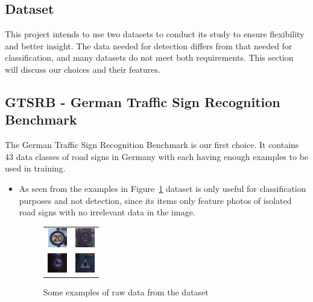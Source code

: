 \documentclass[12pt, landscape, margin=2cm]{article}
\begin{document}
\begin{multicols}{3}
\lipsum[3]

\section{Dataset}
This project intends to use two datasets to conduct its study to ensure
flexibility and better insight. The data needed for detection differs from that
needed for classification, and many datasets do not meet both requirements. This
section will discuss our choices and their features.
\subsection{GTSRB - German Traffic Sign Recognition Benchmark}
The German Traffic Sign Recognition Benchmark is our first choice. It contains
43 data classes of road signs in Germany with each having enough examples to be
used in training.

\begin{itemize}
    \item As seen from the examples in Figure~\ref{fig:ex} dataset is only
    useful for classification purposes and not detection, since its items only
    feature photos of isolated road signs with no irrelevant data in the image.
    \begin{figure}[H]
        \centering
        \begin{tabular}{cc}
        \includegraphics[scale=1.3]{ex1.png}&\includegraphics[scale=1.3]{ex2.png}\\
        \includegraphics[scale=1.3]{ex3.png}&\includegraphics[scale=1.3]{ex4.png}\\
        \end{tabular}
        \caption{Some examples of raw data from the dataset}
        \label{fig:ex}
    \end{figure}


\end{itemize}
\end{multicols}
\end{document}
